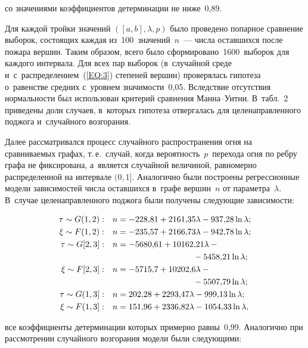 \begin{multicols}{2}
\noindent со значениями коэффициентов детерминации не ниже~0,89.

Для каждой тройки значений $([a,b],\lambda,p)$ было проведено попарное срав\-н\-ение
выборок, со\-сто\-ящих каж\-дая из~100~значений~$n$~--- чис\-ла остав\-ших\-ся
 после пожара вершин.
Таким образом, всего было сформировано~1600~выборок для каждого интервала. Для всех
пар выборок (в~случайной среде и~с~распределением~(\ref{EQ:3}) степеней вершин)
проверялась гипотеза о~равенстве сред\-них с~уров\-нем зна\-чи\-мости~0,05. 
Вслед\-ст\-вие отсутствия
нор\-маль\-ности был использован критерий сравнения Ман\-на--Уит\-ни. 
В~табл.~2 приведены
доли случаев, в~которых гипотеза отвергалась для целенаправленного поджога 
и~случайного возгорания.





Далее рассматривался процесс случайного распространения огня на срав\-ни\-ва\-емых графах,
т.\,е.\ случай, когда ве\-ро\-ят\-ность~$p$~перехода огня по реб\-ру графа не фиксирована, 
а~является случайной величиной, рав\-но\-мер\-но распределенной на интервале $(0,1]$. Аналогично
были по\-стро\-ены регрессионные модели зависимостей чис\-ла оставшихся в~графе вершин~$n$ от
па\-ра\-мет\-ра~$\lambda$. В~случае целенаправленного поджога были получены 
сле\-ду\-ющие зависимости:

\noindent
\begin{align*}
\tau\sim {G}(1,2):\quad & n = -228{,}81+2161{,}35\lambda-937{,}28\ln\lambda;\\
\xi\sim F(1,2):\quad & n = -235{,}57+2166{,}73\lambda-942{,}78\ln\lambda;\\
\tau\sim {G}[2,3]:\quad & n = -5680{,}61+10162{,}21\lambda-{}\\
&\hspace*{34mm}{}-5458{,}21\ln\lambda;\\
\xi\sim F[2,3]:\quad & n = -5715{,}7+10202{,}6\lambda-{}\\
&\hspace*{34mm}{}-5507{,}79\ln\lambda;\\
\tau\sim {G}(1,3]:\quad & n = 202{,}28+2293{,}47\lambda-999{,}13\ln\lambda;\\
\xi\sim F(1,3]:\quad & n = 151{,}96+2336{,}82\lambda-1054{,}33\ln\lambda,
\end{align*}

\noindent все коэффициенты детерминации которых примерно рав\-ны~0,99. Аналогично при
рас\-смот\-ре\-нии случайного возгорания модели были сле\-ду\-ющими:


\end{multicols}
